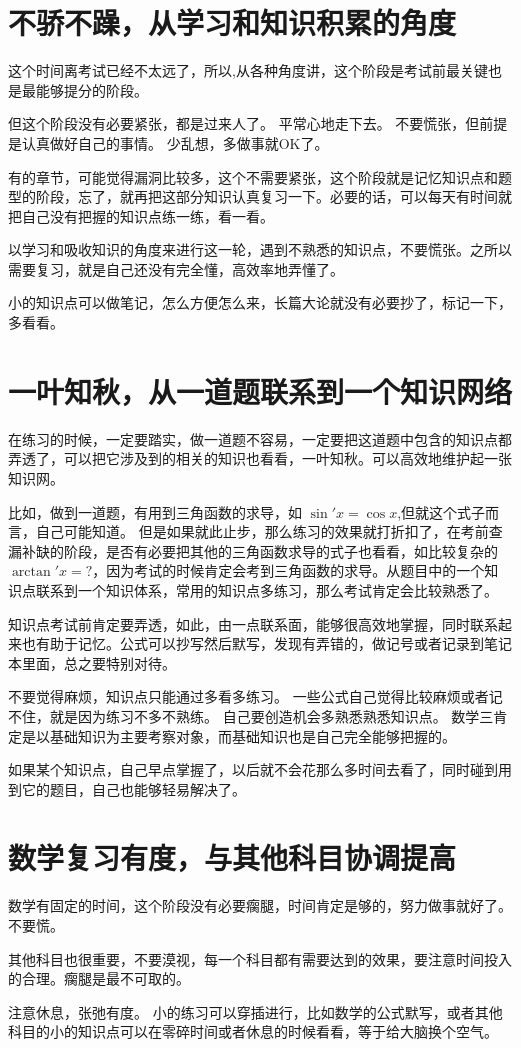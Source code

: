 \documentclass[a4paper]{ctexart}
\begin{document}
\section{不骄不躁，从学习和知识积累的角度}
这个时间离考试已经不太远了，所以,从各种角度讲，这个阶段是考试前最关键也是最能够提分的阶段。
\par
但这个阶段没有必要紧张，都是过来人了。 平常心地走下去。 不要慌张，但前提是认真做好自己的事情。 少乱想，多做事就OK了。
\par
有的章节，可能觉得漏洞比较多，这个不需要紧张，这个阶段就是记忆知识点和题型的阶段，忘了，就再把这部分知识认真复习一下。必要的话，可以每天有时间就把自己没有把握的知识点练一练，看一看。
\par
以学习和吸收知识的角度来进行这一轮，遇到不熟悉的知识点，不要慌张。之所以需要复习，就是自己还没有完全懂，高效率地弄懂了。
\par
小的知识点可以做笔记，怎么方便怎么来，长篇大论就没有必要抄了，标记一下，多看看。

\section{一叶知秋，从一道题联系到一个知识网络}
\par
在练习的时候，一定要踏实，做一道题不容易，一定要把这道题中包含的知识点都弄透了，可以把它涉及到的相关的知识也看看，一叶知秋。可以高效地维护起一张知识网。
\par
比如，做到一道题，有用到三角函数的求导，如 $\sin'{x}=\cos{x}$,但就这个式子而言，自己可能知道。 但是如果就此止步，那么练习的效果就打折扣了，在考前查漏补缺的阶段，是否有必要把其他的三角函数求导的式子也看看，如比较复杂的$\arctan'{x}=?$，因为考试的时候肯定会考到三角函数的求导。从题目中的一个知识点联系到一个知识体系，常用的知识点多练习，那么考试肯定会比较熟悉了。
\par
知识点考试前肯定要弄透，如此，由一点联系面，能够很高效地掌握，同时联系起来也有助于记忆。公式可以抄写然后默写，发现有弄错的，做记号或者记录到笔记本里面，总之要特别对待。 
\par
不要觉得麻烦，知识点只能通过多看多练习。 一些公式自己觉得比较麻烦或者记不住，就是因为练习不多不熟练。 自己要创造机会多熟悉熟悉知识点。 数学三肯定是以基础知识为主要考察对象，而基础知识也是自己完全能够把握的。 
\par
如果某个知识点，自己早点掌握了，以后就不会花那么多时间去看了，同时碰到用到它的题目，自己也能够轻易解决了。



\section{数学复习有度，与其他科目协调提高}
数学有固定的时间，这个阶段没有必要瘸腿，时间肯定是够的，努力做事就好了。不要慌。
\par
其他科目也很重要，不要漠视，每一个科目都有需要达到的效果，要注意时间投入的合理。瘸腿是最不可取的。
\par
注意休息，张弛有度。 小的练习可以穿插进行，比如数学的公式默写，或者其他科目的小的知识点可以在零碎时间或者休息的时候看看，等于给大脑换个空气。
\end{document}
